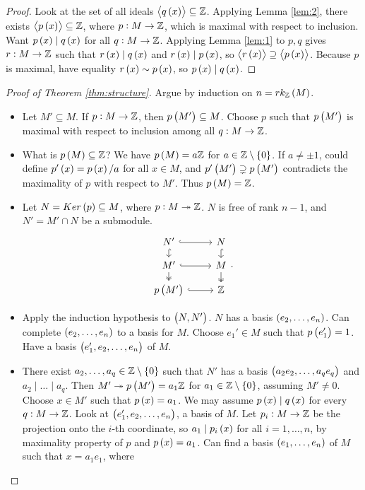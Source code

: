 \pagebreak

\begin{proof}
Look at the set of all ideals $ \abr{q\br{x}} \subseteq \Z $. Applying Lemma \ref{lem:2}, there exists $ \abr{p\br{x}} \subseteq \Z $, where $ p : M \to \mathbb{Z} $, which is maximal with respect to inclusion. Want $ p\br{x} \mid q\br{x} $ for all $ q : M \to \mathbb{Z} $. Applying Lemma \ref{lem:1} to $ p, q $ gives $ r : M \to \mathbb{Z} $ such that $ r\br{x} \mid q\br{x} $ and $ r\br{x} \mid p\br{x} $, so $ \abr{r\br{x}} \supseteq \abr{p\br{x}} $. Because $ p $ is maximal, have equality $ r\br{x} \sim p\br{x} $, so $ p\br{x} \mid q\br{x} $.
\end{proof}

\begin{proof}[Proof of Theorem \ref{thm:structure}]
Argue by induction on $ n = rk_\Z\br{M} $.
\begin{itemize}
\item Let $ M' \subseteq M $. If $ p : M \to \mathbb{Z} $, then $ p\br{M'} \subseteq M $. Choose $ p $ such that $ p\br{M'} $ is maximal with respect to inclusion among all $ q : M \to \mathbb{Z} $.
\item What is $ p\br{M} \subseteq \Z $? We have $ p\br{M} = a\Z $ for $ a \in \Z \setminus \cbr{0} $. If $ a \ne \pm 1 $, could define $ p'\br{x} = p\br{x} / a $ for all $ x \in M $, and $ p'\br{M'} \supsetneq p\br{M'} $ contradicts the maximality of $ p $ with respect to $ M' $. Thus $ p\br{M} = \Z $.
\item Let $ N = Ker\br{p} \subseteq M $, where $ p : M \twoheadrightarrow \mathbb{Z} $. $ N $ is free of rank $ n - 1 $, and $ N' = M' \cap N $ be a submodule.
$$
\begin{tikzcd}[row sep=small]
N' \arrow[hookrightarrow]{r} \arrow[hookrightarrow]{d} & N \arrow[hookrightarrow]{d} \\
M' \arrow[hookrightarrow]{r} \arrow[twoheadrightarrow]{d} & M \arrow[twoheadrightarrow]{d} \\
p\br{M'} \arrow[hookrightarrow]{r} & \Z
\end{tikzcd}.
$$
\item Apply the induction hypothesis to $ \br{N, N'} $. $ N $ has a basis $ \br{e_2, \dots, e_n} $. Can complete $ \br{e_2, \dots, e_n} $ to a basis for $ M $. Choose $ e_1' \in M $ such that $ p\br{e_1'} = 1 $. Have a basis $ \br{e_1', e_2, \dots, e_n} $ of $ M $.
\item There exist $ a_2, \dots, a_q \in \Z \setminus \cbr{0} $ such that $ N' $ has a basis $ \br{a_2e_2, \dots, a_qe_q} $ and $ a_2 \mid \dots \mid a_q $. Then $ M' \twoheadrightarrow p\br{M'} = a_1\Z $ for $ a_1 \in \Z \setminus \cbr{0} $, assuming $ M' \ne 0 $. Choose $ x \in M' $ such that $ p\br{x} = a_1 $. We may assume $ p\br{x} \mid q\br{x} $ for every $ q : M \to \mathbb{Z} $. Look at $ \br{e_1', e_2, \dots, e_n} $, a basis of $ M $. Let $ p_i : M \to \mathbb{Z} $ be the projection onto the $ i $-th coordinate, so $ a_1 \mid p_i\br{x} $ for all $ i = 1, \dots, n $, by maximality property of $ p $ and $ p\br{x} = a_1 $. Can find a basis $ \br{e_1, \dots, e_n} $ of $ M $ such that $ x = a_1e_1 $, where

\end{itemize}
\end{proof}
